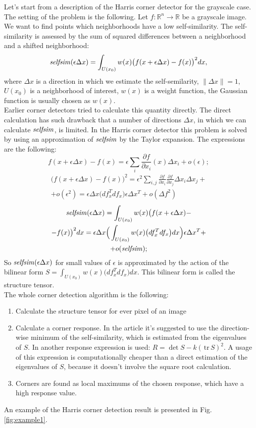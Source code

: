 \documentclass[a4paper,twoside]{article}
\newcommand{\selfsim}{\mathop{\it selfsim}}
\newcommand{\delx}{\Delta x}
\newcommand{\Rone}{\mathbb{R}}
\newcommand{\Rn}{{\mathbb{R}}^n}
\newcommand {\tr}{{\,}\mathrm{tr}{\,}}
\begin{document}
\noindent Let's start from a description of the Harris corner detector for the grayscale case. The setting of the problem is the following. Let $f:\Rn \to \Rone$ be a grayscale image. We want to find points which neighborhoods have a low self-similarity. The self-similarity is assessed by the sum of squared differences between a neighborhood and a shifted neighborhood:
$$\selfsim(\epsilon\delx) = \int_{U(x_0)} w(x) \big(f(x+\epsilon\delx) - f(x)\big)^2 dx,$$
where $\delx$ is a direction in which we estimate the self-semilarity, $\|\delx\| = 1$, $U(x_0)$ is a neighborhood of interest, $w(x)$ is a weight function, the Gaussian function is usually chosen as $w(x)$.
\\
Earlier corner detectors\cite{Moravec1980} tried to calculate this quantity directly. The direct calculation has such drawback that a number of directions $\delx$, in which we can calculate $\selfsim$, is limited. In the Harris corner detector this problem is solved by using an approximation of $\selfsim$ by the Taylor expansion. The expressions are the following:
$$f(x+\epsilon\delx) - f(x) = \epsilon\sum_i \frac{\partial f}{\partial x_i}(x)\delx_i + o(\epsilon);$$
\begin{multline*}
\big(f(x+\epsilon\delx) - f(x)\big)^2 = \epsilon^2\sum_{i, j}\frac{\partial f}{\partial x_i}\frac{\partial f}{\partial x_j}\delx_i\delx_j + \\
+ o(\epsilon^2) = \epsilon\delx\big(df_x^T df_x\big)\epsilon\delx^T + o(\Delta f^2)
\end{multline*}
\begin{multline*}\selfsim(\epsilon\delx) = \int_{U(x_0)} w(x) \big(f(x+\epsilon\delx) -\\
- f(x)\big)^2 dx = \epsilon\delx\Big(\int_{U(x_0)} w(x) \big(df_x^T df_x\big) dx\Big) \epsilon\delx^T + \\
+ o(\selfsim);\end{multline*}
So $\selfsim(\epsilon\delx)$ for small values of $\epsilon$ is approximated by the action of the bilinear form $S=\int_{U(x_0)} w(x) \big(df_x^T df_x\big) dx$. This bilinear form is called the structure tensor. 
\\
The whole corner detection algorithm is the following:
\begin{enumerate}
\item Calculate the structure tensor for ever pixel of an image
\item Calculate a corner response. In the article\cite{Tomasi91} it's suggested to use the direction-wise minimum of the self-similarity, which is estimated from the eigenvalues of $S$. In\cite{Harris} another response expression is used: $R=\det S - k (\tr S)^2$. A usage of this expression is computationally cheaper than a direct estimation of the eigenvalues of $S$, because it doesn't involve the square root calculation. 
\item Corners are found as local maximums of the chosen response, which have a high response value. 
\end{enumerate}
An example of the Harris corner detection result is presented in Fig. \ref{fig:example1}.
\end{document}
